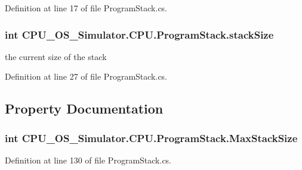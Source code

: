 Definition at line 17 of file Program\+Stack.\+cs.

\hypertarget{class_c_p_u___o_s___simulator_1_1_c_p_u_1_1_program_stack_ab0667a30e4d6e10c3ffddfdfbc084102}{}
\subsubsection[{stack\+Size}]{\setlength{\rightskip}{0pt plus 5cm}int C\+P\+U\+\_\+\+O\+S\+\_\+\+Simulator.\+C\+P\+U.\+Program\+Stack.\+stack\+Size\hspace{0.3cm}{\ttfamily [private]}}\label{class_c_p_u___o_s___simulator_1_1_c_p_u_1_1_program_stack_ab0667a30e4d6e10c3ffddfdfbc084102}


the current size of the stack 



Definition at line 27 of file Program\+Stack.\+cs.



\subsection{Property Documentation}
\hypertarget{class_c_p_u___o_s___simulator_1_1_c_p_u_1_1_program_stack_a5ed770e83658cfcde6e451c27342dca3}{}
\subsubsection[{Max\+Stack\+Size}]{\setlength{\rightskip}{0pt plus 5cm}int C\+P\+U\+\_\+\+O\+S\+\_\+\+Simulator.\+C\+P\+U.\+Program\+Stack.\+Max\+Stack\+Size\hspace{0.3cm}{\ttfamily [get]}}\label{class_c_p_u___o_s___simulator_1_1_c_p_u_1_1_program_stack_a5ed770e83658cfcde6e451c27342dca3}


Definition at line 130 of file Program\+Stack.\+cs.

